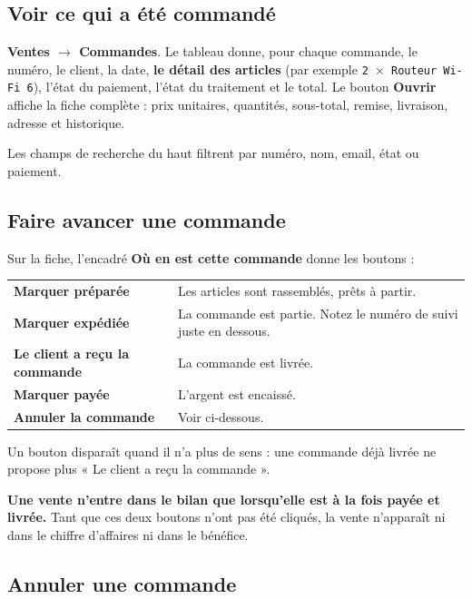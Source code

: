 \documentclass[11pt,a4paper]{article}
\newcommand{\bouton}[1]{\textbf{\textcolor{sig}{#1}}}
\newcommand{\menu}[1]{\textsf{\textbf{#1}}}
\begin{document}
\subsection{Voir ce qui a été commandé}

\menu{Ventes $\rightarrow$ Commandes}. Le tableau donne, pour chaque commande,
le numéro, le client, la date, \textbf{le détail des articles} (par exemple
\texttt{2 $\times$ Routeur Wi-Fi 6}), l'état du paiement, l'état du traitement
et le total. Le bouton \bouton{Ouvrir} affiche la fiche complète : prix
unitaires, quantités, sous-total, remise, livraison, adresse et historique.

Les champs de recherche du haut filtrent par numéro, nom, email, état ou
paiement.

\subsection{Faire avancer une commande}

Sur la fiche, l'encadré \menu{Où en est cette commande} donne les boutons :

\begin{center}
\begin{tabularx}{\textwidth}{@{}lX@{}}
\toprule
\bouton{Marquer préparée} & Les articles sont rassemblés, prêts à partir. \\
\bouton{Marquer expédiée} & La commande est partie. Notez le numéro de suivi juste en dessous. \\
\bouton{Le client a reçu la commande} & La commande est livrée. \\
\bouton{Marquer payée} & L'argent est encaissé. \\
\bouton{Annuler la commande} & Voir ci-dessous. \\
\bottomrule
\end{tabularx}
\end{center}

Un bouton disparaît quand il n'a plus de sens : une commande déjà livrée ne
propose plus « Le client a reçu la commande ».

\begin{attention}
\textbf{Une vente n'entre dans le bilan que lorsqu'elle est à la fois payée et
livrée.} Tant que ces deux boutons n'ont pas été cliqués, la vente n'apparaît
ni dans le chiffre d'affaires ni dans le bénéfice.
\end{attention}

\subsection{Annuler une commande}
\end{document}
